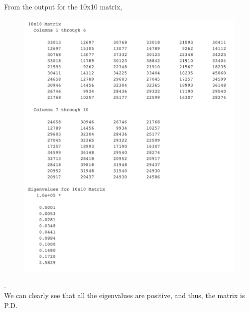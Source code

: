\documentclass[a4paper,11pt]{article}
\begin{document}
{{\begin{enumerate}[leftmargin=*]
			From the output for the 10x10 matrix,
			\pagebreak
			\begin{figure}[h!]
				\includegraphics[width=\linewidth]{10.png}
			\end{figure}.\\
			We can clearly see that all the eigenvalues are positive, and thus, the matrix is P.D.



\end{enumerate}}}
\end{document}
